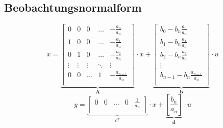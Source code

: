 



\subsection{Beobachtungsnormalform}
\[
	\dot x=
	\underbrace{
		\begin{bmatrix}
			0 &	0 & 0 & \ldots & -\frac{a_0}{a_n}\\
			1 & 0 & 0 & \ldots & -\frac{a_1}{a_n}\\
			0 & 1 & 0 & \ldots & -\frac{a_2}{a_n}\\
			\vdots & \vdots & \vdots & \ddots & \vdots \\
			0 & 0 & \ldots & 1 &-\frac{a_{n-1}}{a_n}\\	
		\end{bmatrix}
	}_{\textbf{A}}
	\cdot x +
	\underbrace{
		\begin{bmatrix}
			b_0-b_n\frac{a_0}{a_n} \\
			b_1-b_n\frac{a_1}{a_n} \\
			b_2-b_n\frac{a_2}{a_n}  \\
			\vdots\\
			b_{n-1}-b_n\frac{a_{n-1}}{a_n}\\	
		\end{bmatrix}
	}_{\textbf{b}}
	\cdot u	
\]
\[
	y=
	\underbrace{
			\begin{bmatrix}
				0 & 0 & \ldots & 0 & \frac{1}{a_n}\\
			\end{bmatrix}
	}_{\textbf{$c^T$}}
	\cdot x  +
	\underbrace{
		\left[ \frac{b_n}{a_n} \right] 
	}_{\textbf{d}}
	\cdot u
\]